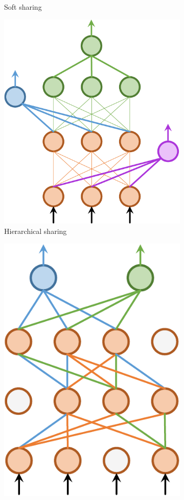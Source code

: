 \documentclass[letterpaper]{article} %
\begin{document}
\begin{figure}[htb]
\begin{subfigure}{0.45\linewidth}
\caption{Soft sharing}
\label{sfig:soft-sharing}
\end{subfigure}\hfill
\quad
\begin{subfigure}{0.45\linewidth}
\centering
\includegraphics[scale=.36]{3353_hier_sharing.pdf}
\caption{Hierarchical sharing}
\label{sfig:hier-sharing}
\end{subfigure}\hfill
\begin{subfigure}{0.45\linewidth}
\centering
\includegraphics[scale=.36]{3353_sparse_sharing.pdf}

\end{subfigure}
\end{figure}
\end{document}
